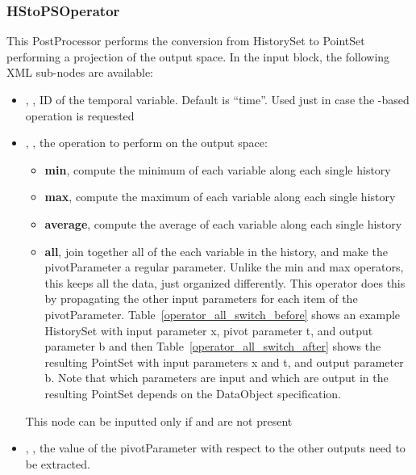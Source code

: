 \subsubsection{HStoPSOperator}
\label{HStoPSOperator}

This PostProcessor performs the conversion from HistorySet to PointSet performing a projection of the output space.
In the  input block, the following XML sub-nodes are available:

\begin{itemize}
   \item {}, , ID of the temporal variable. Default is ``time''.
   \nb Used just in case the  -based operation  is requested
    \item {}, , the operation to perform on the output space:
      \begin{itemize}
        \item \textbf{min}, compute the minimum of each variable along each single history
         \item \textbf{max}, compute the maximum of each variable along each single history
         \item \textbf{average}, compute the average of each variable along each single history
         \item \textbf{all}, join together all of the each variable in
           the history, and make the pivotParameter a regular
           parameter.  Unlike the min and max operators, this keeps
           all the data, just organized differently. This operator
           does this by propagating the other input parameters for
           each item of the pivotParameter.
           Table~\ref{operator_all_switch_before} shows an example
           HistorySet with input parameter x, pivot parameter t, and
           output parameter b and then
           Table~\ref{operator_all_switch_after} shows the resulting
           PointSet with input parameters x and t, and output
           parameter b. Note that which parameters are input and which
           are output in the resulting PointSet depends on the
           DataObject specification.
       \end{itemize}
        \nb This node can be inputted only if  and  are not present
     \item {}, , the value of the pivotParameter with respect to the other outputs need to be extracted.

\end{itemize}
